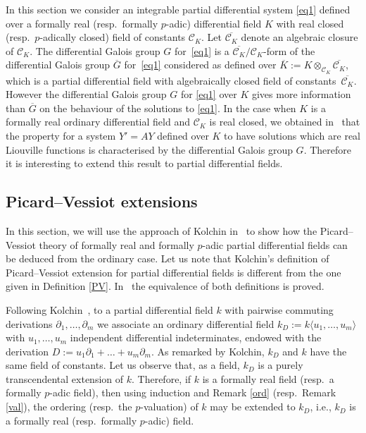 \documentclass[10pt,a4paper]{amsart}
\numberwithin{equation}{section}
\begin{document}
In this section we consider an integrable partial differential system \eqref{eq1} defined over a formally real (resp.\ formally $p$-adic) differential field $K$ with real closed (resp.\ $p$-adically closed) field of constants $\mathcal{C}_K$. Let $\overline{\mathcal{C}_K}$ denote an algebraic closure of $\mathcal{C}_K$. The differential Galois group $G$ for~\eqref{eq1} is a $\overline{\mathcal{C}_K}/\mathcal{C}_K$-form of the differential Galois group $\overline{G}$ for~\eqref{eq1} considered as defined over $\overline{K}:=K\otimes_{\mathcal{C}_K} \overline{\mathcal{C}_K}$, which is a partial differential field with algebraically closed field of constants~$\overline{\mathcal{C}_K}$. However the differential Galois group $G$ for \eqref{eq1} over $K$ gives more information than $\overline{G}$ on the behaviour of the solutions to \eqref{eq1}.
In the case when $K$ is a formally real ordinary differential field and $\mathcal{C}_K$ is real closed, we obtained in~\cite{CH} that the property for a system $Y'=AY$ defined over $K$ to have solutions which are real
Liouville functions is characterised by the differential Galois group $G$. Therefore it is interesting to extend this result to partial differential fields.


\subsection{Picard--Vessiot extensions}

In this section, we will use the approach of Kolchin in~\cite{Kol1} to show how the Picard--Vessiot theory of formally real and formally $p$-adic partial differential fields can be deduced from the ordinary case. Let us note that Kolchin's definition of Picard--Vessiot extension for partial differential fields is different from the one given in Definition \ref{PV}. In~\cite[Theorem 1]{CHJac} the equivalence of both definitions is proved.

\begin{Remark}\label{D} Following Kolchin~\cite{Kol1}, to a partial differential field $k$ with pairwise commu\-ting derivations
$\partial_1, \dots ,\partial_m$ we associate an ordinary differential field $k_D:=k\langle u_1,\dots,u_m \rangle$
with $u_1,\dots,u_m$ independent differential indeterminates, endowed with the derivation $D:=u_1\partial_1+\dots + u_m\partial_m$.
As remarked by Kolchin, $k_D$ and $k$ have the same field of constants.
Let us observe that, as a field, $k_D$ is a purely transcendental extension of $k$. Therefore, if $k$ is a formally real field (resp.\ a formally $p$-adic field), then using induction and Remark \ref{ord} (resp.\ Remark \ref{val}), the ordering (resp.\ the $p$-valuation) of $k$ may be extended to $k_D$, i.e., $k_D$ is a formally real (resp.\ formally $p$-adic) field.
\end{Remark}
\end{document}
